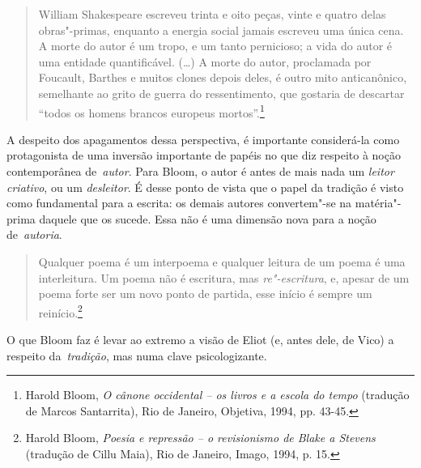 \begin{quote}
William Shakespeare escreveu trinta e oito peças, vinte e quatro delas
obras"-primas, enquanto a energia social jamais escreveu uma única cena.
A morte do autor é um tropo, e um tanto pernicioso; a vida do autor é
uma entidade quantificável. (\ldots{}) A morte do autor, proclamada por
Foucault, Barthes e muitos clones depois deles, é outro mito
anticanônico, semelhante ao grito de guerra do ressentimento, que
gostaria de descartar ``todos os homens brancos europeus
mortos''.\footnote{Harold Bloom, \emph{O cânone occidental -- os livros
  e a escola do tempo} (tradução de Marcos Santarrita), Rio de Janeiro,
  Objetiva, 1994, pp. 43-45.}
\end{quote}

A despeito dos apagamentos dessa perspectiva, é importante considerá-la
como protagonista de uma inversão importante de papéis no que diz
respeito à noção contemporânea de~\emph{autor}. Para Bloom, o autor é
antes de mais nada um \emph{leitor criativo}, ou um \emph{desleitor}. É
desse ponto de vista que o papel da tradição é visto como fundamental
para a escrita: os demais autores convertem"-se na matéria"-prima daquele
que os sucede. Essa não é uma dimensão nova para a noção
de~\emph{autoria}.

\begin{quote}
Qualquer poema é um interpoema e qualquer leitura de um poema é uma
interleitura. Um poema não é escritura, mas \emph{re"-escritura}, e,
apesar de um poema forte ser um novo ponto de partida, esse início é
sempre um reinício.\footnote{Harold Bloom, \emph{Poesia e repressão --
  o revisionismo de Blake a Stevens} (tradução de Cillu Maia), Rio de
  Janeiro, Imago, 1994, p. 15.}
\end{quote}

O que Bloom faz é levar ao extremo a visão de Eliot (e, antes dele, de
Vico) a respeito da~\emph{tradição}, mas numa clave psicologizante.

